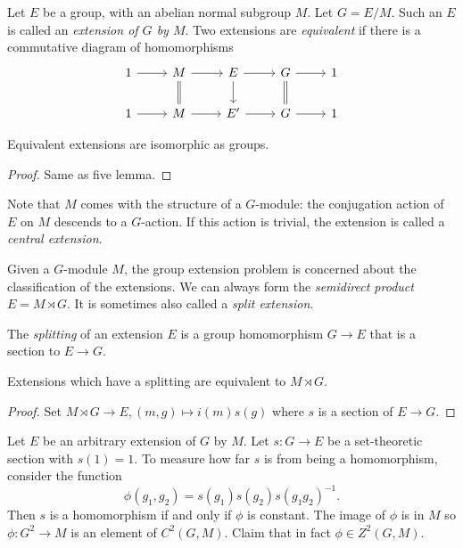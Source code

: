 \documentclass[a4paper]{article}
\begin{document}
Let \(E\) be a group, with an abelian normal subgroup \(M\). Let \(G = E/M\). Such an \(E\) is called an \emph{extension of \(G\) by \(M\)}. Two extensions are \emph{equivalent} if there is a commutative diagram of homomorphisms
\[
  \begin{tikzcd}
    1 \ar[r] & M \ar[r] \ar[d, equal] & E \ar[r] \ar[d] & G \ar[r] \ar[d, equal] & 1 \\
    1 \ar[r] & M \ar[r] & E' \ar[r] & G \ar[r] & 1
  \end{tikzcd}
\]

\begin{lemma}
  Equivalent extensions are isomorphic as groups.
\end{lemma}

\begin{proof}
  Same as five lemma.
\end{proof}

Note that \(M\) comes with the structure of a \(G\)-module: the conjugation action of \(E\) on \(M\) descends to a \(G\)-action. If this action is trivial, the extension is called a \emph{central extension}.

Given a \(G\)-module \(M\), the group extension problem is concerned about the classification of the extensions. We can always form the \emph{semidirect product} \(E = M \rtimes G\). It is sometimes also called a \emph{split extension}.

\begin{definition}[splitting]
  The \emph{splitting} of an extension \(E\) is a group homomorphism \(G \to E\) that is a section to \(E \to G\).
\end{definition}

\begin{proposition}
  Extensions which have a splitting are equivalent to \(M \rtimes G\).
\end{proposition}

\begin{proof}
  Set \(M \rtimes G \to E, (m, g) \mapsto i(m) s(g)\) where \(s\) is a section of \(E \to G\).
\end{proof}

Let \(E\) be an arbitrary extension of \(G\) by \(M\). Let \(s: G \to E\) be a set-theoretic section with \(s(1) = 1\). To measure how far \(s\) is from being a homomorphism, consider the function
\[
  \phi(g_1, g_2) = s(g_1) s(g_2) s(g_1g_2)^{-1}.
\]
Then \(s\) is a homomorphism if and only if \(\phi\) is constant. The image of \(\phi\) is in \(M\) so \(\phi: G^2 \to M\) is an element of \(C^2(G, M)\). Claim that in fact \(\phi \in Z^2(G, M)\).
\end{document}

